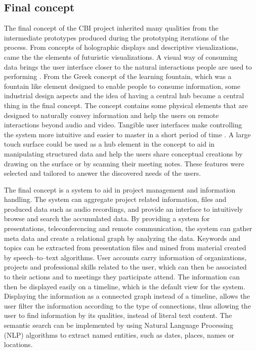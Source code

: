 \documentclass[english,12pt,a4paper,dvips]{article}
\begin{document}


\subsection{Final concept}


The final concept of the CBI project inherited many qualities from the intermediate prototypes produced during the prototyping iterations of the process. From concepts of holographic displays and descriptive visualizations, came the the elements of futuristic visualizations. A visual way of consuming data brings the user interface closer to the natural interactions people are used to performing \cite{Underkoffler} \cite{Shaer}. From the Greek concept of the learning fountain, which was a fountain like element designed to enable people to consume information, some industrial design aspects and the idea of having a central hub became a central thing in the final concept. The concept contains some physical elements that are designed to naturally convey information and help the users on remote interactions beyond audio and video. Tangible user interfaces make controlling the system more intuitive and easier to master in a short period of time \cite{Shaer}. A large touch surface could be used as a hub element in the concept to aid in manipulating structured data and help the users share conceptual creations by drawing on the surface or by scanning their meeting notes. These features were selected and tailored to answer the discovered needs of the users.

The final concept is a system to aid in project management and information handling. The system can aggregate project related information, files and produced data such as audio recordings, and provide an interface to intuitively browse and search the accumulated data. By providing a system for presentations, teleconferencing and remote communication, the system can gather meta data and create a relational graph by analyzing the data. Keywords and topics can be extracted from presentation files and mined from material created by speech--to--text algorithms. User accounts carry information of organizations, projects and professional skills related to the user, which can then be associated to their actions and to meetings they participate attend. The information can then be displayed easily on a timeline, which is the default view for the system. Displaying the information as a connected graph instead of a timeline, allows the user filter the information according to the type of connections, thus allowing the user to find information by its qualities, instead of literal text content. The semantic search can be implemented by using Natural Language Processing (NLP) algorithms to extract named entities, such as dates, places, names or locations.
\end{document}
